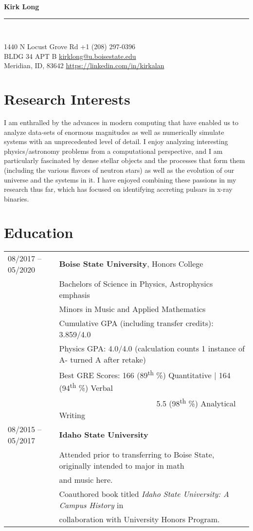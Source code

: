 \documentclass[11pt]{article}
\newcommand{\makeheading}[2]%
        {\begin{minipage}[t]{\textwidth}%
                 {\LARGE \bfseries #1} \\[-0.3\baselineskip]%
                 \rule{\columnwidth}{1.5pt}\\[0.1\baselineskip]
         \end{minipage}}
\begin{document}
\makeheading{Kirk Long}{}

1440 N Locust Grove Rd				\hfill	+1 (208) 297-0396\\
BLDG 34 APT B	\hfill	\href{mailto:kirklong@u.boisestate.edu}{kirklong@u.boisestate.edu}\\
Meridian, ID, 83642			\hfill	\url{https://linkedin.com/in/kirkalan}



\section{Research Interests}
 I am enthralled by the advances in modern computing that have enabled us to analyze data-sets of enormous magnitudes as well as numerically simulate systems with an unprecedented level of detail. I enjoy analyzing interesting physics/astronomy problems from a computational perspective, and I am particularly fascinated by dense stellar objects and the processes that form them (including the various flavors of neutron stars) as well as the evolution of our universe and the systems in it. I have enjoyed combining these passions in my research thus far, which has focused on identifying accreting pulsars in x-ray binaries.

\section{Education}
\begin{tabular}{ll}
08/2017 -- 05/2020	& 	\textbf{Boise State University}, Honors College \\
			&	Bachelors of Science in Physics, Astrophysics emphasis\\
			&	Minors in Music and Applied Mathematics\vspace{1mm} \\
			&	Cumulative GPA (including transfer credits): 3.859/4.0\\
      & Physics GPA: 4.0/4.0 (calculation counts 1 instance of A- turned A after retake)\\
      & Best GRE Scores: 166 (89\textsuperscript{th} \%) Quantitative | 164 (94\textsuperscript{th} \%) Verbal \\
      & \-\ \-\ \-\ \-\ \-\ \-\ \-\ \-\ \-\ \-\ \-\ \-\ \-\ \-\ \-\ \-\ \-\ \-\ \-\ \-\ \-\ \-\ \-\ \-\ \-\ 5.5 (98\textsuperscript{th} \%) Analytical Writing \vspace{2mm} \\
08/2015 -- 05/2017 & \textbf{Idaho State University} \\
      & Attended prior to transferring to Boise State, originally intended to major in math\\
      & and music here.\\
      & Coauthored book titled \textit{Idaho State University: A Campus History} in \\
      & collaboration with University Honors Program.\\

\end{tabular}
\end{document}
